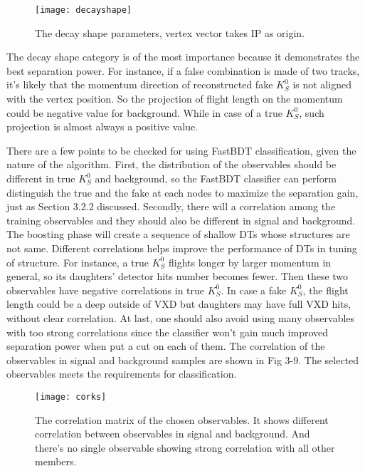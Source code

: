 \begin{figure}
	\centering
	\texttt{[image: decayshape]}
	\caption{The decay shape parameters, vertex vector takes IP as origin. }
\end{figure}


The decay shape category is of the most importance because it demonstrates the best separation power. For instance, if a false combination is made of two tracks, it's likely that the momentum direction of reconstructed fake $K_S^0$ is not aligned with the vertex position. So the projection of flight length on the momentum could be negative value for background. While in case of a true $K_S^0$, such projection is almost always a positive value.
 
There are a few points to be checked for using FastBDT classification, given the nature of the algorithm.
 First, the distribution of the observables should be different in true $K_S^0$ and background, so the FastBDT classifier can perform distinguish the true and the fake at each nodes to maximize the separation gain, just as Section 3.2.2 discussed. Secondly, there will a correlation among the training observables and they should also be different in signal and background. The boosting phase will create a sequence of shallow DTs whose structures are not same. Different correlations helps improve the performance of DTs in tuning of structure. For instance, a true $K_S^0$ flights longer by larger momentum in general, so its daughters' detector hits number becomes fewer. Then these two observables have negative correlations in true $K_S^0$. In case a fake $K_S^0$, the flight length could be a deep outside of VXD  but daughters may have full VXD hits, without clear correlation. At last, one should also avoid using many observables with too strong correlations since the classifier won't gain much improved separation power when put a cut on each of them. The correlation of the observables in signal and background samples are shown in Fig 3-9. The selected observables meets the requirements for classification. 
 
 \begin{figure}
 	\centering 
 	\texttt{[image: corks]}
 	\caption{The correlation matrix of the chosen observables. It shows different correlation between observables in signal and background. And there's no single observable showing strong correlation with all other members. }
 \end{figure}
 

